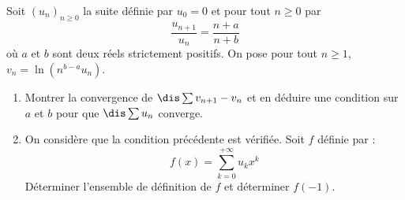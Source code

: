 \documentclass[a4paper,10pt]{report}
\begin{document}
\begin{Exercice}{} Soit $(u_n)_{n \geq 0}$ la suite définie par $u_0=0$ et pour tout $n \geq 0$ par 
$$ \dfrac{u_{n+1}}{u_n} = \dfrac{n+a}{n+b}$$
où $a$ et $b$ sont deux réels strictement positifs. On pose pour tout $n \geq 1$, $v_n = \ln(n^{b-a}u_n)$.
\begin{enumerate}
\item Montrer la convergence de $\dis \sum v_{n+1}- v_n$ et en déduire une condition sur $a$ et $b$ pour que $\dis \sum u_n$ converge.
\item On considère que la condition précédente est vérifiée. Soit $f$ définie par :
$$ f(x) = \sum_{k=0}^{+ \infty} u_k x^k$$
Déterminer l'ensemble de définition de $f$ et déterminer $f(-1)$.
\end{enumerate}
\end{Exercice}
\end{document}
